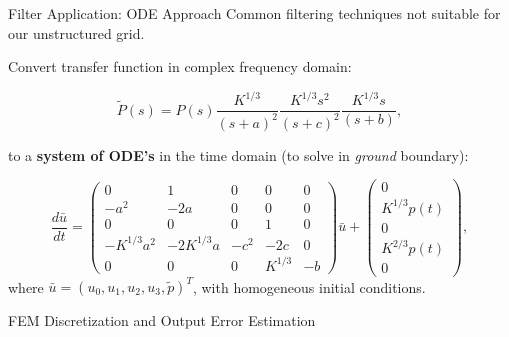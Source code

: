 \documentclass{beamer}
\newcounter{sectionframecount}
\begin{document}
\begin{frame}[t]{Filter Application: ODE Approach}
\vspace{-10pt}
Common filtering techniques not suitable for our unstructured grid.

\vspace{8pt}
Convert transfer function in complex frequency domain:

\begin{equation}
  \tilde{P}(s) =P(s)\dfrac{K^{1/3}}{(s+a)^2}\dfrac{K^{1/3}s^2}{(s+c)^2}\dfrac{K^{1/3}s}{(s+b)},
\end{equation}

to a \textbf{system of ODE's} in the time domain (to solve in \textit{ground} boundary):

\begin{equation}
  \dfrac{d\bar{u}}{dt} =
      \begin{pmatrix}
          0 & 1 & 0 & 0 & 0\\
          -a^2 & -2a & 0 & 0 & 0\\
          0 & 0 & 0 & 1 & 0\\
          -K^{1/3}a^2 & -2K^{1/3}a & -c^2 & -2c & 0\\
          0 & 0 & 0 &K^{1/3} & -b
      \end{pmatrix}
      \bar{u}
      +
      \begin{pmatrix}
          0 \\
          K^{1/3}p(t)\\
          0\\
          K^{2/3}p(t)\\
          0
      \end{pmatrix},
  \end{equation}
where $\bar{u}=(u_0,u_1,u_2,u_3,\tilde{p})^T$, with homogeneous initial conditions.
\end{frame}



\begin{frame}[plain]
  \vfill
  \centering
  {FEM Discretization and Output Error Estimation}
  \vfill
\end{frame}
\end{document}
